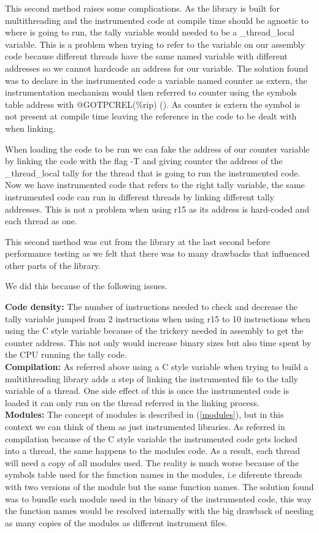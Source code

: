 \documentclass[12pt,a4paper]{report}
\begin{document}
This second method raises some complications. As the library is built for multithreading and the instrumented code at compile time should be agnostic to where is going to run, the tally variable would needed to be a \_thread\_local variable. This is a problem when trying to refer to the variable on our assembly code because different threads have the same named variable with different addresses so we cannot hardcode an address for our variable. The solution found was to declare in the instrumented code a variable named counter as extern, the instrumentation mechanism would then referred to counter using the symbols table address with @GOTPCREL(\%rip) (\cite{stack gotp}). As counter is extern the symbol is not present at compile time leaving the reference in the code to be dealt with when linking.

When loading the code to be run we can fake the address of our counter variable by linking the code with the flag -T and giving counter the address of the \_thread\_local tally for the thread that is going to run the instrumented code. Now we have instrumented code that refers to the right tally variable, the same instrumented code can run in different threads by linking different tally addresses. This is not a problem when using r15 as its address is hard-coded and each thread as one. 

This second method was cut from the library at the last second before performance testing as we felt that there was to many drawbacks that influenced other parts of the library.

We did this because of the following issues.

	\textbf{Code density:}
		The number of instructions needed to check and decrease the tally variable jumped from 2 instructions when using r15 to 10 instructions when using the C style variable because of the trickery needed in assembly to get the counter address. This not only would increase binary sizes but also time spent by the CPU running the tally code.
		\\
	\textbf{Compilation:}
		As referred above using a C style variable when trying to build a multithreading library adds a step of linking the instrumented file to the tally variable of a thread. One side effect of this is once the instrumented code is loaded it can only run on the thread referred in the linking process.
		\\
	\textbf{Modules:}
		The concept of modules is described in (\ref{modules}), but in this context we can think of them as just instrumented libraries.
		As referred in compilation because of the C style variable the instrumented code gets locked into a thread, the same happens to the modules code. As a result, each thread will need a copy of all modules used. The reality is much worse because of the symbols table used for the function names in the modules, i.e diferente threads with two versions of the module but the same function names. The solution found was to bundle each module used in the binary of the instrumented code, this way the function names would be resolved internally with the big drawback of needing as many copies of the modules as different instrument files.
\end{document}
